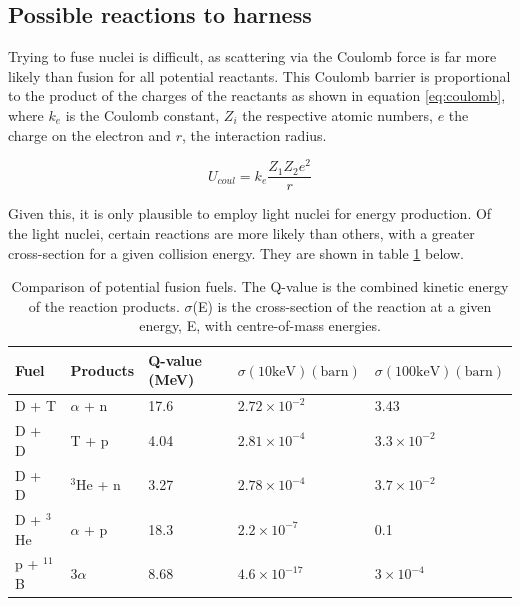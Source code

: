 
\subsection{Possible reactions to harness}
Trying to fuse nuclei is difficult, as scattering via the Coulomb force is far more likely than fusion for all potential reactants. This Coulomb barrier is proportional to the product of the charges of the reactants as shown in equation \ref{eq:coulomb}, where $k_{e}$ is the Coulomb constant, $Z_{i}$ the respective atomic numbers, $e$ the charge on the electron and $r$, the interaction radius.

\begin{equation}
  \label{eq:coulomb}
  U_{coul} = k_{e}\frac{Z_{1}Z_{2}e^{2}}{r}
\end{equation}

Given this, it is only plausible to employ light nuclei for energy production. Of the light nuclei, certain reactions are more likely than others, with a greater cross-section for a given collision energy. They are shown in table \ref{tab:fuels} below.

\begin{table}[h]
\centering
\caption{Comparison of potential fusion fuels. The Q-value is the combined kinetic energy of the reaction products. $\sigma$(E) is the cross-section of the reaction at a given energy, E, with centre-of-mass energies.}
\label{tab:fuels}
\begin{tabular}{@{}lllll@{}}
\toprule
Fuel          & Products          & Q-value (MeV) & $\sigma \mathrm{(10 keV) (barn)}$ & $\sigma \mathrm{(100 keV) (barn)}$ \\ \midrule
D + T         & $\alpha$ + n        & 17.6          & $2.72\times10^{-2}$    & 3.43                    \\
D + D         & T + p             & 4.04          & $2.81\times10^{-4}$    & $3.3\times10^{-2}$      \\
D + D         & $^{3}$He + n      & 3.27          & $2.78\times10^{-4}$    & $3.7\times10^{-2}$      \\
D + $^{3}$He  & $\alpha$ + p        & 18.3          & $2.2\times10^{-7}$     & 0.1                     \\
p + $^{11}$B  & $3\alpha$           & 8.68          & $4.6\times10^{-17}$    & $3\times10^{-4}$        \\ \bottomrule
\end{tabular}
\end{table}

